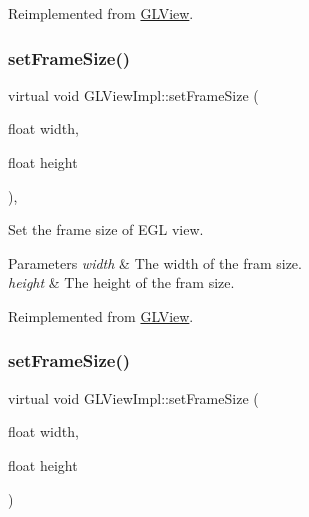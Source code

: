 Reimplemented from \hyperlink{classGLView_ac18f93506550c54c119f7ae87f33f220}{G\+L\+View}.

\mbox{\label{classGLViewImpl_a16286e087255bfe27d0bef183761eaa0}} 
\subsubsection{\texorpdfstring{set\+Frame\+Size()}{setFrameSize()}\hspace{0.1cm}{\footnotesize\ttfamily [2/3]}}
{\footnotesize\ttfamily virtual void G\+L\+View\+Impl\+::set\+Frame\+Size (\begin{DoxyParamCaption}\item[{float}]{width,  }\item[{float}]{height }\end{DoxyParamCaption})\hspace{0.3cm}{\ttfamily [override]}, {\ttfamily [virtual]}}

Set the frame size of E\+GL view.


\begin{DoxyParams}{Parameters}
{\em width} & The width of the fram size. \\
\hline
{\em height} & The height of the fram size. \\
\hline
\end{DoxyParams}


Reimplemented from \hyperlink{classGLView_ac18f93506550c54c119f7ae87f33f220}{G\+L\+View}.

\mbox{\label{classGLViewImpl_ab7eed967b49c7807cbaeb186e3df8f1c}} 
\subsubsection{\texorpdfstring{set\+Frame\+Size()}{setFrameSize()}\hspace{0.1cm}{\footnotesize\ttfamily [3/3]}}
{\footnotesize\ttfamily virtual void G\+L\+View\+Impl\+::set\+Frame\+Size (\begin{DoxyParamCaption}\item[{float}]{width,  }\item[{float}]{height }\end{DoxyParamCaption})\hspace{0.3cm}{\ttfamily [virtual]}}


